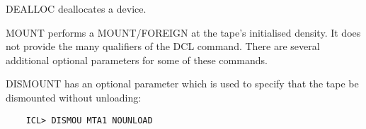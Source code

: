 DEALLOC deallocates a device.

MOUNT performs a MOUNT/FOREIGN at the tape's initialised density.
It does not provide the many qualifiers of the DCL command.
There are several additional optional parameters for some of these commands.

DISMOUNT has an optional parameter which is used to specify that the tape be
dismounted without unloading:

\begin{small}
\begin{verbatim}
    ICL> DISMOU MTA1 NOUNLOAD
\end{verbatim}
\end{small}
